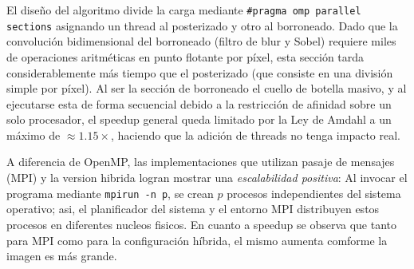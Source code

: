 El diseño del algoritmo divide la carga mediante \texttt{\#pragma omp parallel sections} asignando un thread al posterizado y otro al borroneado. Dado que la convolución bidimensional del borroneado (filtro de blur y Sobel) requiere miles de operaciones aritméticas en punto flotante por píxel, esta sección tarda considerablemente más tiempo que el posterizado (que consiste en una división simple por píxel). 
Al ser la sección de borroneado el cuello de botella masivo, y al ejecutarse esta de forma secuencial debido a la restricción de afinidad sobre un solo procesador,  el speedup general queda limitado por la Ley de Amdahl a un máximo de $\approx 1.15\times$, haciendo que la adición de threads no tenga impacto real.

A diferencia de OpenMP, las implementaciones que utilizan pasaje de mensajes (MPI) y la version hibrida logran mostrar una \textit{escalabilidad positiva}:
Al invocar el programa mediante \texttt{mpirun -n p}, se crean $p$ procesos independientes del sistema operativo; asi, el planificador del sistema y el entorno MPI distribuyen estos procesos en diferentes nucleos fisicos.
En cuanto a speedup se observa que tanto para MPI como para la configuración híbrida, el mismo aumenta comforme la imagen es más grande.
